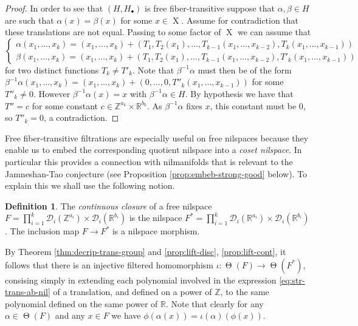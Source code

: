 \documentclass[a4paper,12pt,reqno]{amsart}
\theoremstyle{definition}
\newtheorem{defn}[theorem]{Definition}
\def\to{\rightarrow}
\newcommand{\mc}{\mathcal}
\newcommand{\mb}{\mathbb}
\DeclareMathOperator{\tran}{\Theta}
\DeclareMathOperator{\ns}{X}
\begin{document}
\begin{proof}
In order to see that $(H,H_\bullet)$ is free fiber-transitive suppose that $\alpha,\beta\in H$ are such that $\alpha(x)=\beta(x)$ for some $x\in \ns$. Assume for contradiction that these translations are not equal. Passing to some factor of $\ns$ we can assume that
\[
\begin{cases}
 \alpha(x_1,\ldots,x_k)=(x_1,\ldots,x_k)+(T_1,T_2(x_1),\ldots,T_{k-1}(x_1,\ldots,x_{k-2}),T_k(x_1,\ldots,x_{k-1}))\\
 \beta(x_1,\ldots,x_k)=(x_1,\ldots,x_k)+(T_1,T_2(x_1),\ldots,T_{k-1}(x_1,\ldots,x_{k-2}),T'_k(x_1,\ldots,x_{k-1}))
\end{cases}
\]
for two distinct functions $T_k\not=T'_k$. Note that $\beta^{-1}\alpha$ must then be of the form $\beta^{-1}\alpha(x_1,\ldots,x_k)=(x_1,\ldots,x_k)+(0,\ldots,0,T''_k(x_1,\ldots,x_{k-1}))$ for some $T''_k\not=0$. However $\beta^{-1}\alpha(x)=x$ with $\beta^{-1}\alpha\in H$. By hypothesis we have that $T''=c$ for some constant $c\in \mb{Z}^{a_k}\times \mb{R}^{b_k}$. As $\beta^{-1}\alpha$ fixes $x$, this constant must be 0, so $T''_k=0$, a contradiction.
\end{proof}

\noindent Free fiber-transitive filtrations are especially useful on free nilspaces because they enable us to embed the corresponding quotient nilspace into a \emph{coset nilspace}. In particular this provides a connection with nilmanifolds that is relevant to the Jamneshan-Tao conjecture (see Proposition \ref{prop:embeb-strong-good} below). To explain this we shall use the following notion.
\begin{defn}\label{def:ctsclosure}
The \emph{continuous closure} of a free nilspace $F=\prod_{i=1}^k\mc{D}_i(\mb{Z}^{a_i})\times \mc{D}_i(\mb{R}^{b_i})$ is the nilspace $F^*=\prod_{i=1}^k\mc{D}_i(\mb{R}^{a_i})\times\mc{D}_i( \mb{R}^{b_i})$. The inclusion map $F\to F^*$ is a nilspace morphism.
\end{defn}

By Theorem \ref{thm:decrip-trans-group} and \eqref{prop:lift-disc}, \eqref{prop:lift-cont}, it follows that there is an injective filtered homomorphism $\iota:\tran(F)\to \tran(F^*)$, consising simply in extending each polynomial involved in the expression \eqref{eq:str-trans-ab-nil} of a translation, and defined on a power of $\mb{Z}$, to the same polynomial defined on the same power of $\mb{R}$. Note that clearly for any $\alpha\in \tran(F)$ and any $x\in F$ we have $\phi(\alpha(x))=\iota(\alpha)(\phi(x))$.
\end{document}
